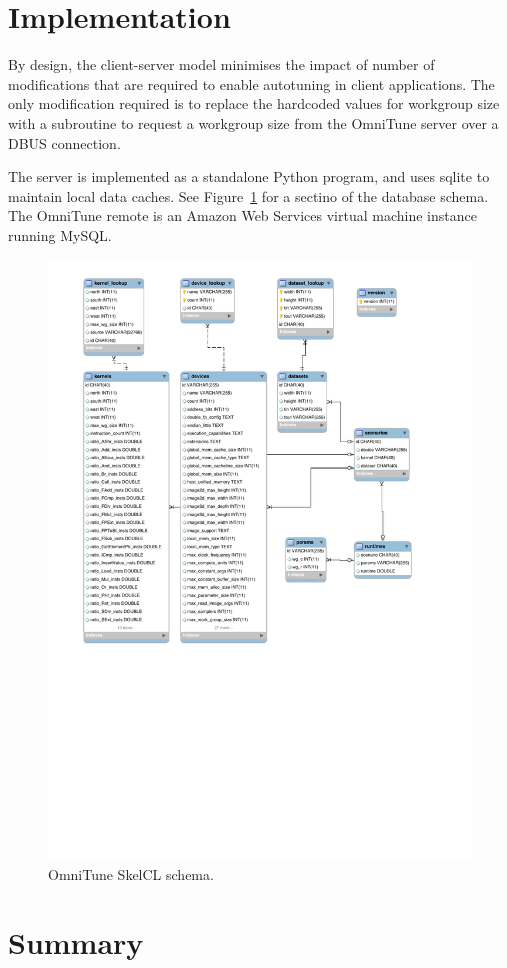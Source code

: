 \section{Implementation}

By design, the client-server model minimises the impact of number of
modifications that are required to enable autotuning in client
applications. The only modification required is to replace the
hardcoded values for workgroup size with a subroutine to request a
workgroup size from the OmniTune server over a DBUS connection.

The server is implemented as a standalone Python program, and uses
sqlite to maintain local data caches. See
Figure~\ref{fig:omnitune-system-flow} for a sectino of the database
schema. The OmniTune remote is an Amazon Web Services virtual machine
instance running MySQL.

\begin{figure}
\centering
\includegraphics[width=.75\textwidth]{img/omnitune-data-schema.pdf}
\caption{%
  OmniTune SkelCL schema.%
}
\label{fig:omnitune-system-flow}
\end{figure}


\section{Summary}

\TODO{\ldots}

